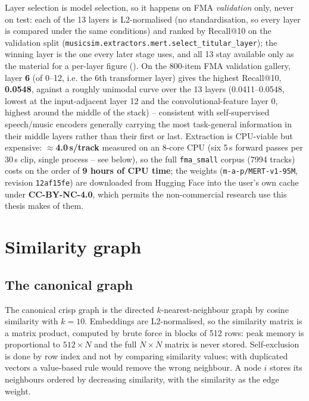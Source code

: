 Layer selection is model selection, so it happens on FMA \emph{validation}
only, never on test: each of the 13 layers is L2-normalised (no
standardisation, so every layer is compared under the same conditions) and
ranked by Recall@10 on the validation split
(\texttt{musicsim.extractors.mert.select\_titular\_layer}); the winning layer
is the one every later stage uses, and all 13 stay available only as the
material for a per-layer figure ().
On the 800-item FMA validation gallery, layer \textbf{6} (of 0--12, i.e. the
6th transformer layer) gives the highest Recall@10, \textbf{0.0548}, against a
roughly unimodal curve over the 13 layers (0.0411--0.0548, lowest at the
input-adjacent layer 12 and the convolutional-feature layer 0, highest around
the middle of the stack) -- consistent with self-supervised speech/music
encoders generally carrying the most task-general information in their middle
layers rather than their first or last. Extraction is CPU-viable but
expensive: \textbf{$\approx$4.0\,s/track} measured on an 8-core CPU (six 5\,s
forward passes per 30\,s clip, single process -- see below), so the full
\texttt{fma\_small} corpus (7994 tracks) costs on the order of
\textbf{9 hours of CPU time}; the weights
(\texttt{m-a-p/MERT-v1-95M}, revision \texttt{12af15fe}) are downloaded from
Hugging Face into the user's own cache under \textbf{CC-BY-NC-4.0}, which
permits the non-commercial research use this thesis makes of them.


\section{Similarity graph}
\label{sec:graph}

\subsection{The canonical graph}
\label{sec:graph-canonical}

The canonical crisp graph is the directed $k$-nearest-neighbour graph by cosine
similarity with $k=10$. Embeddings are L2-normalised, so the similarity matrix
is a matrix product, computed by brute force in blocks of 512 rows: peak memory
is proportional to $512\times N$ and the full $N\times N$ matrix is never
stored. Self-exclusion is done by row index and not by comparing similarity
values; with duplicated vectors a value-based rule would remove the wrong
neighbour. A node $i$ stores its neighbours ordered by decreasing similarity,
with the similarity as the edge weight.

